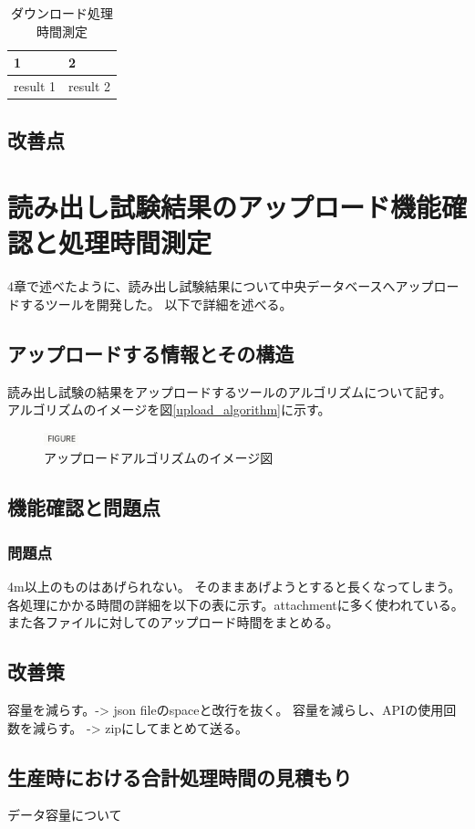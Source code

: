 \begin{table}[tbp]
\begin{center}
\caption[ダウンロード処理時間測定]{ダウンロード処理時間測定}
\label{download_measurement}
  \begin{tabular}{|ll|} \hline
    1 & 2 \\ \hline
    result 1 & result 2 \\ \hline 
  \end{tabular}
\end{center}
\end{table}

\subsection{改善点}

\section{読み出し試験結果のアップロード機能確認と処理時間測定}
4章で述べたように、読み出し試験結果について中央データベースへアップロードするツールを開発した。
以下で詳細を述べる。
\subsection{アップロードする情報とその構造}
読み出し試験の結果をアップロードするツールのアルゴリズムについて記す。
アルゴリズムのイメージを図\ref{upload_algorithm}に示す。

\begin{figure}[bpt]\centering
\includegraphics[width=1cm]{figure}
\caption[アップロードアルゴリズムのイメージ図]{アップロードアルゴリズムのイメージ図}
\label{download_algorithm}
\end{figure}

\subsection{機能確認と問題点}
\subsubsection{問題点}
4m以上のものはあげられない。
そのままあげようとすると長くなってしまう。
各処理にかかる時間の詳細を以下の表に示す。attachmentに多く使われている。
また各ファイルに対してのアップロード時間をまとめる。

\subsection{改善策}
容量を減らす。-> json fileのspaceと改行を抜く。
容量を減らし、APIの使用回数を減らす。 -> zipにしてまとめて送る。

\subsection{生産時における合計処理時間の見積もり}
データ容量について

